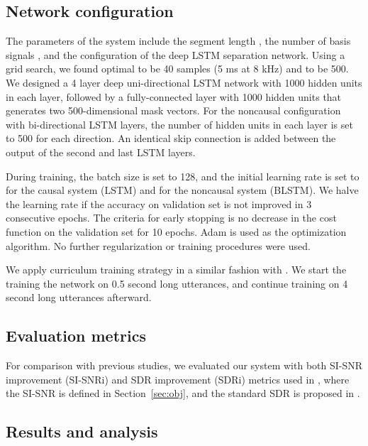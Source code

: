 \documentclass{article}
\begin{document}
\subsection{Network configuration}

The parameters of the system include the segment length , the number of basis signals , and the configuration of the deep LSTM separation network. Using a grid search, we found optimal  to be 40 samples (5 ms at 8 kHz) and  to be 500. We designed a 4 layer deep uni-directional LSTM network with 1000 hidden units in each layer, followed by a fully-connected layer with 1000 hidden units that generates two 500-dimensional mask vectors. For the noncausal configuration with bi-directional LSTM layers, the number of hidden units in each layer is set to 500 for each direction. An identical skip connection is added between the output of the second and last LSTM layers.

During training, the batch size is set to 128, and the initial learning rate is set to  for the causal system (LSTM) and  for the noncausal system (BLSTM). We halve the learning rate if the accuracy on validation set is not improved in 3 consecutive epochs. The criteria for early stopping is no decrease in the cost function on the validation set for 10 epochs. Adam \cite{kingma2014adam} is used as the optimization algorithm. No further regularization or training procedures were used.

We apply curriculum training strategy \cite{bengio2009curriculum} in a similar fashion with \cite{isik2016single, chen2017deep}. We start the training the network on 0.5 second long utterances, and continue training on 4 second long utterances afterward.

\subsection{Evaluation metrics}

For comparison with previous studies, we evaluated our system with both SI-SNR improvement (SI-SNRi) and SDR improvement (SDRi) metrics used in \cite{isik2016single, kolbaek2017multitalker, chen2017deep}, where the SI-SNR is defined in Section~\ref{sec:obj}, and the standard SDR is proposed in \cite{vincent2006performance}.

\subsection{Results and analysis}
\end{document}

